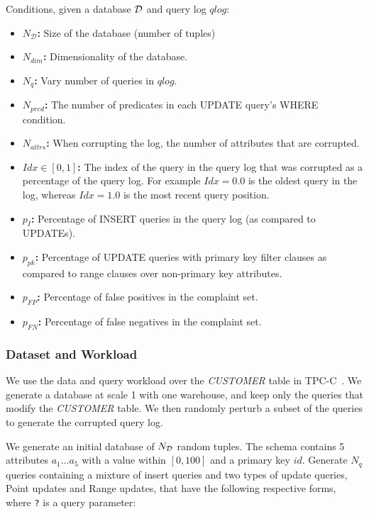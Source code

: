 Conditions, given a database ${\cal D}$ and query log $qlog$:

\begin{itemize}
\item {\bf $N_\mathcal{D}$: } Size of the database (number of tuples)
\item {\bf $N_{dim}$:} Dimensionality of the database.
\item {\bf $N_q$:} Vary number of queries in $qlog$.
\item {\bf $N_{pred}$:} The number of predicates in each UPDATE query's WHERE condition.
\item {\bf $N_{attrs}$: } When corrupting the log, the number of attributes that are corrupted.
\item {\bf $Idx \in [0, 1]$: } The index of the query in the query log that was corrupted as a percentage of the query log.  
      For example $Idx = 0.0$ is the oldest query in the log, whereas $Idx = 1.0$ is the most recent query position.
\item {\bf $p_{I}$: } Percentage of INSERT queries in the query log (as compared to UPDATEs).
\item {\bf $p_{pk}$: } Percentage of UPDATE queries with primary key filter clauses as compared to range clauses over non-primary key attributes.
\item {\bf $p_{FP}$: } Percentage of false positives in the complaint set.
\item {\bf $p_{FN}$: } Percentage of false negatives in the complaint set.
\end{itemize}

\subsubsection{Dataset and Workload}


 We use the data and query workload over the {\it
CUSTOMER} table in TPC-C~\cite{}.  We generate a database at scale
1 with one warehouse, and keep only the queries that modify the
{\it CUSTOMER} table.  We then randomly perturb a subset of the
queries to generate the corrupted query log.

We generate an initial database of $N_{\cal D}$ random tuples.  
The schema contains 5 attributes $a_1\ldots a_5$ with a value
within $[0, 100]$ and a primary key $id$. 
Generate $N_q$ queries containing a mixture of insert queries 
and two types of update
queries, Point updates and Range updates, that have the following respective forms, 
where \verb|?| is a query parameter:

